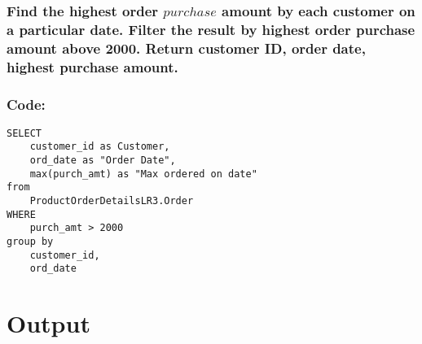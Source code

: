 \documentclass[12pt]{article}
\begin{document}
\vspace{13mm}

\subsubsection{Find the highest order \(purchase\) amount by each customer on a particular date. Filter the result by highest order purchase amount above 2000. Return customer ID, order date, highest purchase amount.}
\subsubsection*{Code:}
\begin{verbatim}
SELECT
    customer_id as Customer,
    ord_date as "Order Date",
    max(purch_amt) as "Max ordered on date"
from
    ProductOrderDetailsLR3.Order
WHERE
    purch_amt > 2000
group by
    customer_id,
    ord_date
\end{verbatim}

\vspace{10mm}

\section{Output}

\end{document}
